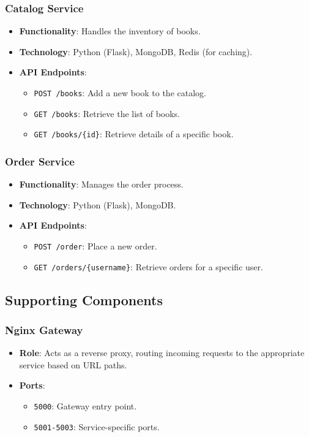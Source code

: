 \documentclass{article}
\begin{document}
\subsubsection{Catalog Service}
\begin{itemize}
    \item \textbf{Functionality}: Handles the inventory of books.
    \item \textbf{Technology}: Python (Flask), MongoDB, Redis (for caching).
    \item \textbf{API Endpoints}:
    \begin{itemize}
        \item \texttt{POST /books}: Add a new book to the catalog.
        \item \texttt{GET /books}: Retrieve the list of books.
        \item \texttt{GET /books/\{id\}}: Retrieve details of a specific book.
    \end{itemize}
\end{itemize}

\subsubsection{Order Service}
\begin{itemize}
    \item \textbf{Functionality}: Manages the order process.
    \item \textbf{Technology}: Python (Flask), MongoDB.
    \item \textbf{API Endpoints}:
    \begin{itemize}
        \item \texttt{POST /order}: Place a new order.
        \item \texttt{GET /orders/\{username\}}: Retrieve orders for a specific user.
    \end{itemize}
\end{itemize}

\subsection{Supporting Components}

\subsubsection{Nginx Gateway}
\begin{itemize}
    \item \textbf{Role}: Acts as a reverse proxy, routing incoming requests to the appropriate service based on URL paths.
    \item \textbf{Ports}:
    \begin{itemize}
        \item \texttt{5000}: Gateway entry point.
        \item \texttt{5001-5003}: Service-specific ports.
    \end{itemize}
\end{itemize}
\end{document}
